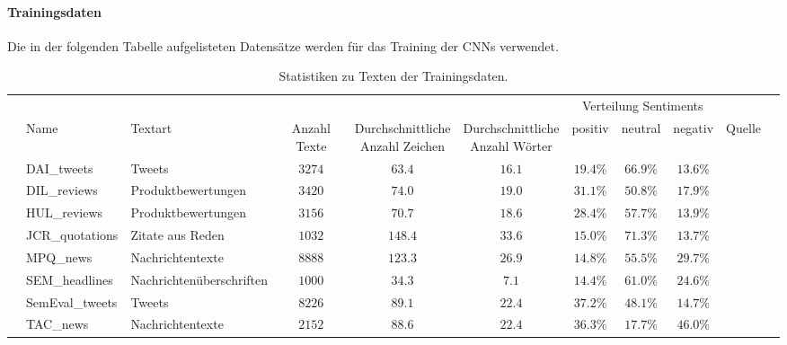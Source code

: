 \paragraph{Trainingsdaten} Die in der folgenden Tabelle aufgelisteten Datensätze werden für das Training der \gls{CNN}s verwendet.
\begin{table}[H]
	\begin{adjustbox}{max width=\textwidth}
		\begin{tabular}{@{}lllcccccccl@{}}
			\toprule
			& & & & & & \multicolumn{3}{c}{Verteilung Sentiments} &\\
			\cmidrule(r){7-9}
			& Name & Textart & Anzahl Texte & \specialcell{Durchschnittliche\\Anzahl Zeichen} & \specialcell{Durchschnittliche\\Anzahl Wörter} & positiv & neutral & negativ & Quelle &\\ \midrule
			& DAI{\_}tweets & Tweets & $3274$ & $63.4$ & $16.1$ & $19.4\%$ & $66.9\%$ & $13.6\%$ & \cite{Narr:2012}\\
			& DIL{\_}reviews & Produktbewertungen & $3420$ & $74.0$ & $19.0$ & $31.1\%$ & $50.8\%$ & $17.9\%$ & \cite{Ding:2008}\\
			& HUL{\_}reviews & Produktbewertungen & $3156$ & $70.7$ & $18.6$ & $28.4\%$ & $57.7\%$ & $13.9\%$ & \cite{Hu:2004}\\
			& JCR{\_}quotations & Zitate aus Reden & $1032$ & $148.4$ & $33.6$ & $15.0\%$ & $71.3\%$ & $13.7\%$ & \cite{Balahur:2013}\\
			& MPQ{\_}news & Nachrichtentexte & $8888$ & $123.3$ & $26.9$ & $14.8\%$ & $55.5\%$ & $29.7\%$ & \cite{Wiebe:2005}\\
			& SEM{\_}headlines & Nachrichtenüberschriften & $1000$ & $34.3$ & $7.1$ & $14.4\%$ & $61.0\%$ & $24.6\%$ & \cite{Strapparava:2007}\\
			& SemEval{\_}tweets & Tweets & $8226$ & $89.1$ & $22.4$ & $37.2\%$ & $48.1\%$ & $14.7\%$ & \cite{SemEval:2016:task4}\\
			& TAC{\_}news & Nachrichtentexte & $2152$ & $88.6$ & $22.4$ & $36.3\%$ & $17.7\%$ & $46.0\%$ & \cite{Tackstrom:2011}\\
			\bottomrule
		\end{tabular}
	\end{adjustbox}
	\caption{Statistiken zu Texten der Trainingsdaten.}
\end{table}

